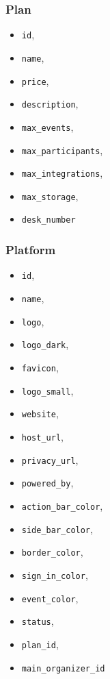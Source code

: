 \subsubsection{Plan}
\begin{itemize}
	\item \verb|id|,
	\item \verb|name|,
	\item \verb|price|,
	\item \verb|description|,
	\item \verb|max_events|,
	\item \verb|max_participants|,
	\item \verb|max_integrations|,
	\item \verb|max_storage|,
	\item \verb|desk_number|
\end{itemize}

\subsubsection{Platform}
\begin{itemize}
	\item \verb|id|,
	\item \verb|name|,
	\item \verb|logo|,
	\item \verb|logo_dark|,
	\item \verb|favicon|,
	\item \verb|logo_small|,
	\item \verb|website|,
	\item \verb|host_url|,
	\item \verb|privacy_url|,
	\item \verb|powered_by|,
	\item \verb|action_bar_color|,
	\item \verb|side_bar_color|,
	\item \verb|border_color|,
	\item \verb|sign_in_color|,
	\item \verb|event_color|,
	\item \verb|status|,
	\item \verb|plan_id|,
	\item \verb|main_organizer_id|
\end{itemize}

